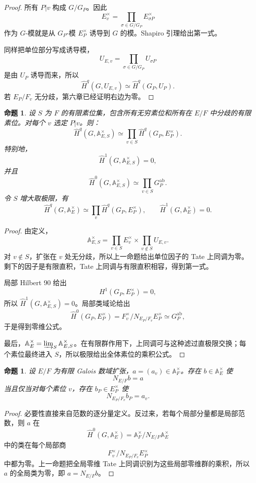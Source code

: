 \documentclass[11pt,a4paper,openany]{ctexbook}
\numberwithin{equation}{chapter}
\newcommand{\A}{\mathbb{A}}
\theoremstyle{plain}
\newtheorem{proposition}[theorem]{命题}
\theoremstyle{definition}
\theoremstyle{remark}
\begin{document}
\begin{proof}
所有 $P|v$ 构成 $G/G_P$。因此
\[
E_v^\times=\prod_{\sigma\in G/G_P}E_{\sigma P}^\times
\]
作为 $G$-模就是从 $G_P$-模 $E_P^\times$ 诱导到 $G$ 的模。Shapiro 引理给出第一式。

同样把单位部分写成诱导模，
\[
U_{E,v}=\prod_{\sigma\in G/G_P}U_{\sigma P}
\]
是由 $U_P$ 诱导而来，所以
\[
\widehat H^q(G,U_{E,v})\simeq \widehat H^q(G_P,U_P).
\]
若 $E_P/F_v$ 无分歧，第六章已经证明右边为零。
\end{proof}

\begin{proposition}
设 $S$ 为 $F$ 的有限素位集，包含所有无穷素位和所有在 $E/F$ 中分歧的有限素位。对每个 $v$ 选定 $P|v$。则：
\[
\widehat H^q(G,\A_{E,S}^\times)\simeq\prod_{v\in S}\widehat H^q(G_P,E_P^\times).
\]
特别地，
\[
\widehat H^1(G,\A_{E,S}^\times)=0,
\]
并且
\[
\widehat H^0(G,\A_{E,S}^\times)\simeq\prod_{v\in S}G_P^{\operatorname{ab}}.
\]
令 $S$ 增大取极限，有
\[
\widehat H^q(G,\A_E^\times)\simeq\prod_v \widehat H^q(G_P,E_P^\times),
\qquad
\widehat H^1(G,\A_E^\times)=0.
\]
\end{proposition}

\begin{proof}
由定义，
\[
\A_{E,S}^\times=\prod_{v\in S}E_v^\times\times\prod_{v\notin S}U_{E,v}.
\]
对 $v\notin S$，扩张在 $v$ 处无分歧，所以上一命题给出单位因子的 Tate 上同调为零。剩下的因子是有限直积，Tate 上同调与有限直积相容，得到第一式。

局部 Hilbert 90 给出
\[
H^1(G_P,E_P^\times)=0,
\]
所以 $\widehat H^1(G,\A_{E,S}^\times)=0$。局部类域论给出
\[
\widehat H^0(G_P,E_P^\times)=F_v^\times/N_{E_P/F_v}E_P^\times
\simeq G_P^{\operatorname{ab}},
\]
于是得到零维公式。

最后，$\A_E^\times=\varinjlim_S\A_{E,S}^\times$。在有限群作用下，上同调可与这种滤过直极限交换；每个素位最终进入 $S$，所以极限给出全体素位的乘积公式。
\end{proof}

\begin{proposition}
设 $E/F$ 为有限 Galois 数域扩张，$a=(a_v)\in\A_F^\times$。存在 $b\in\A_E^\times$ 使
\[
N_{E/F}b=a
\]
当且仅当对每个素位 $v$，存在 $b_P\in E_P^\times$ 使
\[
N_{E_P/F_v}b_P=a_v.
\]
\end{proposition}

\begin{proof}
必要性直接来自范数的逐分量定义。反过来，若每个局部分量都是局部范数，则 $a$ 在
\[
\widehat H^0(G,\A_E^\times)=\A_F^\times/N_{E/F}\A_E^\times
\]
中的类在每个局部商
\[
F_v^\times/N_{E_P/F_v}E_P^\times
\]
中都为零。上一命题把全局零维 Tate 上同调识别为这些局部零维群的乘积，所以 $a$ 的全局类为零，即 $a=N_{E/F}b$。
\end{proof}
\end{document}

